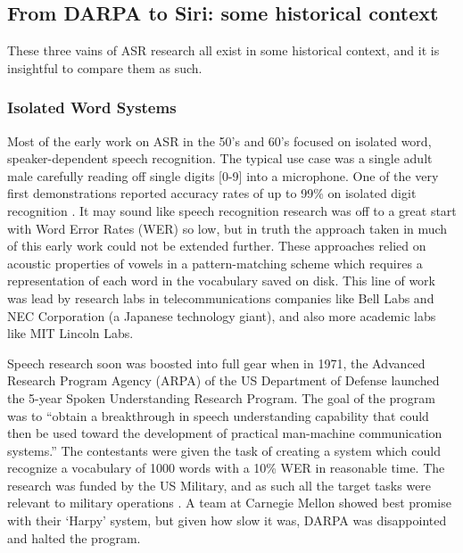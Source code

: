 \documentclass[10pt,a4paper]{article}
\begin{document}
\subsection{From DARPA to Siri: some historical context}

These three vains of ASR research all exist in some historical context, and it is insightful to compare them as such. 

\subsubsection{Isolated Word Systems}
Most of the early work on ASR in the 50's and 60's focused on isolated word, speaker-dependent speech recognition. The typical use case was a single adult male carefully reading off single digits [0-9] into a microphone. One of the very first demonstrations reported accuracy rates of up to 99\% on isolated digit recognition \cite{davis1952automatic}. It may sound like speech recognition research was off to a great start with Word Error Rates (WER) so low, but in truth the approach taken in much of this early work could not be extended further. These approaches relied on acoustic properties of vowels in a pattern-matching scheme which requires a representation of each word in the vocabulary saved on disk. This line of work was lead by research labs in telecommunications companies like Bell Labs and NEC Corporation (a Japanese technology giant), and also more academic labs like MIT Lincoln Labs.

Speech research soon was boosted into full gear when in 1971, the Advanced Research Program Agency (ARPA) of the US Department of Defense launched the 5-year Spoken Understanding Research Program. The goal of the program was to ``obtain a breakthrough in speech understanding capability that could then be used toward the development of practical man-machine communication systems.'' \cite{klatt1977} The contestants were given the task of creating a system which could recognize a vocabulary of 1000 words with a 10\% WER in reasonable time. The research was funded by the US Military, and as such all the target tasks were relevant to military operations \cite{juang2005automatic}. A team at Carnegie Mellon showed best promise with their `Harpy' system, but given how slow it was, DARPA was disappointed and halted the program.
 
\end{document}
